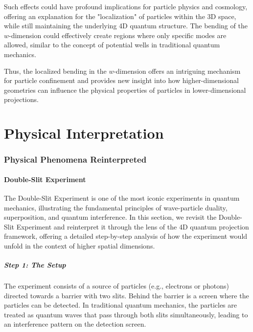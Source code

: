 \documentclass[12pt]{article}
\begin{document}
Such effects could have profound implications for particle physics and cosmology, offering an explanation for the "localization" of particles within the 3D space, while still maintaining the underlying 4D quantum structure. The bending of the \( w \)-dimension could effectively create regions where only specific modes are allowed, similar to the concept of potential wells in traditional quantum mechanics.

Thus, the localized bending in the \( w \)-dimension offers an intriguing mechanism for particle confinement and provides new insight into how higher-dimensional geometries can influence the physical properties of particles in lower-dimensional projections.

\newpage

\part{Physical Interpretation}

\section{Physical Phenomena Reinterpreted}

\subsection{Double-Slit Experiment}

The Double-Slit Experiment is one of the most iconic experiments in quantum mechanics, illustrating the fundamental principles of wave-particle duality, superposition, and quantum interference. In this section, we revisit the Double-Slit Experiment and reinterpret it through the lens of the 4D quantum projection framework, offering a detailed step-by-step analysis of how the experiment would unfold in the context of higher spatial dimensions.

\subsubsection{Step 1: The Setup}

The experiment consists of a source of particles (e.g., electrons or photons) directed towards a barrier with two slits. Behind the barrier is a screen where the particles can be detected. In traditional quantum mechanics, the particles are treated as quantum waves that pass through both slits simultaneously, leading to an interference pattern on the detection screen.
\end{document}
